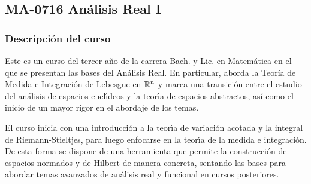 \newpage
\subsection*{MA-0716 Análisis Real I}

\hypertarget{MA0716}{}
\begin{refsection}
\begin{table}[H]
\end{table}



\subsubsection*{Descripción del curso}

Este es un curso del tercer año de la carrera Bach. y Lic. en Matemática en el que se presentan las bases del Análisis Real. En particular, aborda la Teoría de Medida e Integración de Lebesgue en $\mathbb{R}^n$ y marca una transici\'{o}n entre el estudio del an\'{a}lisis de espacios eucl\'{\i}deos y la teor\'{\i}a de espacios abstractos, así como el inicio de un mayor rigor en el abordaje de los temas. 

El curso inicia con una introducci\'{o}n a la teor\'{\i}a de variación acotada y la integral de Riemann-Stieltjes, para luego enfocarse en la teor\'{\i}a de la medida e integraci\'{o}n. De esta forma se
dispone de una herramienta que permite la construcci\'{o}n de espacios normados y de Hilbert de manera concreta, sentando las bases para abordar temas avanzados de an\'{a}lisis real y funcional en cursos posteriores.


\end{refsection}
